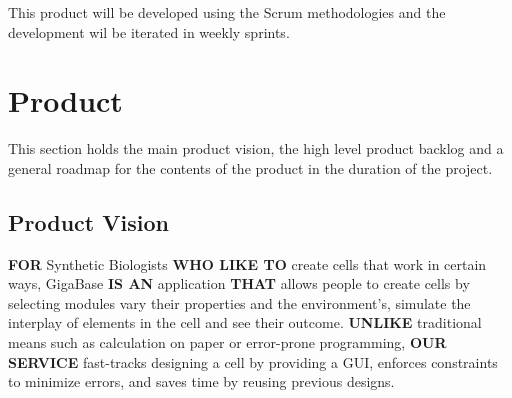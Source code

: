 \documentclass[10pt,a4paper]{report}
\begin{document}
This product will be developed using the Scrum methodologies and the development wil be iterated in weekly sprints.

	\clearpage

	\section{Product}
		This section holds the main product vision, the high level product backlog and a general roadmap for the contents of the product in the duration of the project.
		\subsection{Product Vision}
			\textbf{FOR} Synthetic Biologists \textbf{WHO LIKE TO} create cells that work in certain ways, GigaBase \textbf{IS AN} application \textbf{THAT} allows people to create cells by selecting modules vary their properties and the environment’s, simulate the interplay of elements in the cell and see their outcome. \textbf{UNLIKE} traditional means such as calculation on paper or error-prone programming, \textbf{OUR SERVICE} fast-tracks designing a cell by providing a GUI, enforces constraints to minimize errors, and saves time by reusing previous designs.
\end{document}
